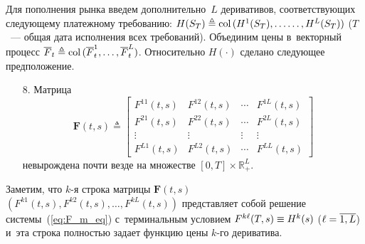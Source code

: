 \begin{multicols}{2}
Для пополнения рынка введем дополнительно~$L$ деривативов, соответствующих следующему платежному требованию: $H(S_T) 
\triangleq \col (H^1(S_T), \ldots\linebreak \ldots , H^L(S_T))$ ($T$~--- общая дата исполнения всех требований).
Объединим цены в~векторный процесс $\overline{F}_t \triangleq \mathop{\mathrm{col}}\, (\overline{F}_t^1,\ldots,\overline{F}_t^L)$. 
Относительно $H(\cdot)$ сделано следующее предположение.
\begin{enumerate}
\item[8.] Матрица
\begin{equation*}
\mathbf{F}(t,s) \triangleq
\left[
\begin{array}{cccc}
F^{11}(t,s) & F^{12}(t,s) & \cdots & F^{1L}(t,s) \\
F^{21}(t,s) & F^{22}(t,s) & \cdots & F^{2L}(t,s) \\
\vdots & \vdots & \vdots & \vdots \\
F^{L1}(t,s) & F^{L2}(t,s) & \cdots & F^{LL}(t,s)
\end{array}
\right]
\end{equation*}
невырождена почти везде на множестве \mbox{$[0,T] \times \mathbb{R}_+^{L}$}.
\end{enumerate}

 Заметим, что $k$-я строка матрицы $\mathbf{F}(t,s)$ $(F^{k1}(t,s) , F^{k2}(t,s) , \ldots , F^{kL}(t,s))$ представляет собой решение системы~(\ref{eq:F_m_eq})
 с~терминальным условием $F^{k\ell}(T,s) \hm\equiv H^k(s)$ ($\ell \hm= \overline{1,L}$) и~эта строка полностью задает функцию цены $k$-го дериватива.


\end{multicols}
